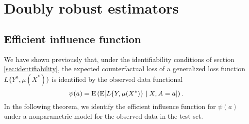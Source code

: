 

\section{Doubly robust estimators} \label{sec:dr}

\subsection{Efficient influence function}
We have shown previously that, under the identifiability conditions of section \ref{sec:identifiability}, the expected counterfactual loss of a generalized loss function $L\{Y^a, \mu(X^*)\}$ is identified by the observed data functional
\begin{equation*}\label{eqn:cl_estimand}
    \psi(a) = \operatorname{E}\left(\operatorname{E}[L\{Y, \mu(X^*)\} \mid X, A=a] \right).
\end{equation*}
In the following theorem, we identify the efficient influence function for $\psi(a)$ under a nonparametric model for the observed data in the test set. 

